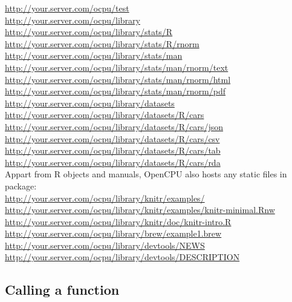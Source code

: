 \documentclass{scrartcl}\usepackage[]{graphicx}\usepackage[]{color}
\begin{document}
\indent \url{http://your.server.com/ocpu/test} \\
\indent \url{http://your.server.com/ocpu/library} \\
\indent \url{http://your.server.com/ocpu/library/stats/R} \\
\indent \url{http://your.server.com/ocpu/library/stats/R/rnorm} \\
\indent \url{http://your.server.com/ocpu/library/stats/man} \\
\indent \url{http://your.server.com/ocpu/library/stats/man/rnorm/text} \\
\indent \url{http://your.server.com/ocpu/library/stats/man/rnorm/html} \\
\indent \url{http://your.server.com/ocpu/library/stats/man/rnorm/pdf} \\
\indent \url{http://your.server.com/ocpu/library/datasets} \\
\indent \url{http://your.server.com/ocpu/library/datasets/R/cars} \\
\indent \url{http://your.server.com/ocpu/library/datasets/R/cars/json} \\
\indent \url{http://your.server.com/ocpu/library/datasets/R/cars/csv} \\
\indent \url{http://your.server.com/ocpu/library/datasets/R/cars/tab} \\
\indent \url{http://your.server.com/ocpu/library/datasets/R/cars/rda} \\

\noindent Appart from R objects and manuals, OpenCPU also hosts any static files in package: \\

\indent \url{http://your.server.com/ocpu/library/knitr/examples/} \\
\indent \url{http://your.server.com/ocpu/library/knitr/examples/knitr-minimal.Rnw} \\
\indent \url{http://your.server.com/ocpu/library/knitr/doc/knitr-intro.R} \\
\indent \url{http://your.server.com/ocpu/library/brew/example1.brew} \\
\indent \url{http://your.server.com/ocpu/library/devtools/NEWS} \\
\indent \url{http://your.server.com/ocpu/library/devtools/DESCRIPTION} 


\subsection{Calling a function}
\end{document}
